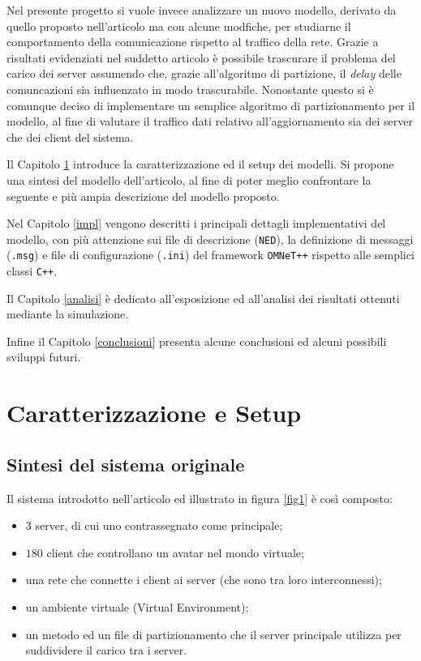 \documentclass[a4paper, 11pt, oneside]{book}
\theoremstyle{definition}
\theoremstyle{remark}
\begin{document}
Nel presente progetto si vuole invece analizzare un nuovo modello, derivato
da quello proposto nell'articolo ma con alcune modfiche, per studiarne il
comportamento della comunicazione rispetto al traffico della rete.
Grazie a risultati evidenziati nel suddetto articolo è possibile trascurare
il problema del carico dei server assumendo che, grazie all'algoritmo di
partizione, il \emph{delay} delle comuncazioni sia influenzato in modo
trascurabile. Nonostante questo si è comunque deciso di implementare un
semplice algoritmo di partizionamento per il modello, al fine di  valutare
il traffico dati relativo all'aggiornamento sia dei server che dei client
del sistema.

Il Capitolo \ref{setup} introduce la caratterizzazione ed il setup dei
modelli. Si propone una sintesi del modello dell'articolo, al fine di poter
meglio confrontare la seguente e più ampia descrizione del modello proposto.

Nel Capitolo \ref{impl} vengono descritti i principali dettagli implementativi
del modello, con più attenzione sui file di descrizione (\texttt{NED}),
la definizione di messaggi (\texttt{.msg}) e file di configurazione
(\texttt{.ini}) del framework \texttt{OMNeT++} rispetto alle semplici classi
\texttt{C++}.

Il Capitolo \ref{analisi} è dedicato all'esposizione ed all'analisi dei
risultati ottenuti mediante la simulazione.

Infine il Capitolo \ref{conclusioni} presenta alcune conclusioni ed alcuni
possibili sviluppi futuri.


\chapter{Caratterizzazione e Setup}\label{setup}
\section{Sintesi del sistema originale}\label{modello_orig}
Il sistema introdotto nell'articolo ed illustrato in figura \ref{fig1}
è così composto:
\begin{itemize}
\item
$3$ server, di cui uno contrassegnato come principale;
\item
$180$ client che controllano un avatar nel mondo virtuale;
\item
una rete che connette i client ai server (che sono tra loro interconnessi);
\item
un ambiente virtuale (Virtual Environment);
\item
un metodo ed un file di partizionamento che il server principale utilizza per
suddividere il carico tra i server.
\end{itemize}
\end{document}

